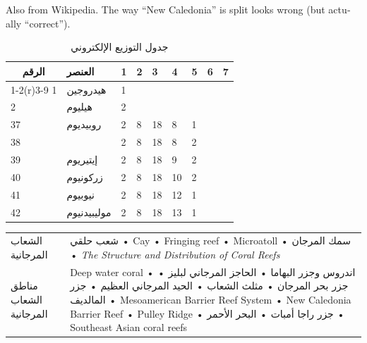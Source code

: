 \documentclass[a4paper]{book}
\begin{document}
\foreignlanguage*{english}{Also from Wikipedia. The way “New Caledonia”
is split looks wrong (but actually “correct”).}

\begin{table}
\centering
\caption{جدول التوزيع الإلكتروني}
\begin{tabular}{lllllllll}
\toprule
\multicolumn{1}{c}{الرقم} &  العنصر & 1 & 2 & 3 & 4 & 5 & 6 & 7\\
\cmidrule(r){1-2}\cmidrule(r){3-9}
1 & هيدروجين & 1\\
2 & هيليوم & 2\\
37 & روبيديوم & 2 & 8 & 18 & 8 & 1\\
38 & \color{red}{سترانشيوم} & 2 & 8 & 18 & 8 & 2\\
39 & إيتيريوم & 2 & 8 & 18 & 9 & 2\\
40 & زركونيوم & 2 & 8 & 18 & 10 & 2\\
41 & نيوبيوم & 2 & 8 & 18 & 12 & 1\\
42 & موليبيدنيوم & 2 & 8 & 18 & 13 & 1\\
\bottomrule
\end{tabular}
\end{table}

\begin{center}
\begin{tabular}{lp{8cm}}
  \toprule
  الشعاب المرجانية
  & شعب حلقي • Cay • Fringing reef • Microatoll •
    سمك المرجان • \foreignlanguage{english}{\textit{The Structure and
    Distribution of Coral Reefs}}\\[1ex]
  مناطق الشعاب  المرجانية
  & Deep water coral • اندروس وجزر البهاما • الحاجز المرجاني لبليز •
    جزر بحر المرجان • مثلث الشعاب • الحيد المرجاني العظيم • جزر المالديف •
    Mesoamerican Barrier Reef System • New Caledonia Barrier Reef • Pulley
    Ridge • جزر راجا أمبات • البحر الأحمر • Southeast Asian coral reefs\\
  \bottomrule
\end{tabular}
\end{center}
\end{document}
